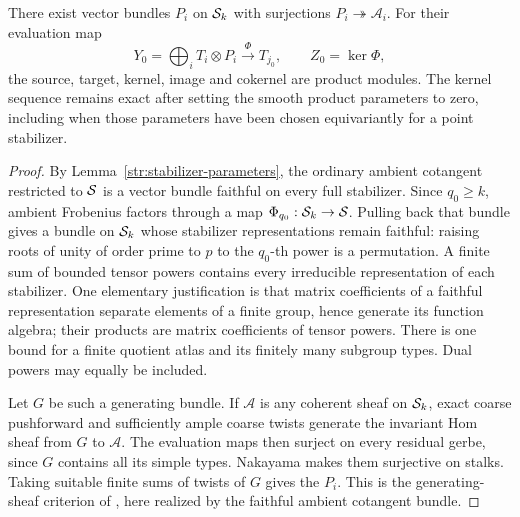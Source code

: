 \begin{lemma}\label{eu:three-modules}
There exist vector bundles $P_i$ on $\mathcal S_k$ with surjections
$P_i\twoheadrightarrow\mathcal A_i$.  For their evaluation map
\begin{equation}\label{eu:evaluation}
 Y_0=\bigoplus_iT_i\otimes P_i
       \xrightarrow{\ \Phi\ }T_{j_0},\qquad Z_0=\ker\Phi,
\end{equation}
the source, target, kernel, image and cokernel are product modules.
The kernel sequence remains exact after setting the smooth product
parameters to zero, including when those parameters have been chosen
equivariantly for a point stabilizer.
\end{lemma}

\begin{proof}
By Lemma~\ref{str:stabilizer-parameters}, the ordinary ambient
cotangent restricted to $\mathcal S$ is a vector bundle faithful on every
full stabilizer.  Since $q_0\ge k$, ambient Frobenius factors through
a map $\Phi_{q_0}:\mathcal S_k\to\mathcal S$.  Pulling back that bundle gives a
bundle on $\mathcal S_k$ whose stabilizer representations remain faithful:
raising roots of unity of order prime to $p$ to the $q_0$-th power
is a permutation.  A finite sum of
bounded tensor powers contains every irreducible representation of
each stabilizer.  One elementary justification is that matrix
coefficients of a faithful representation separate elements of a
finite group, hence generate its function algebra; their products are
matrix coefficients of tensor powers.  There is one bound for a
finite quotient atlas and its finitely many subgroup types.  Dual
powers may equally be included.

Let $G$ be such a generating bundle.  If $\mathcal A$ is any coherent
sheaf on $\mathcal S_k$, exact coarse pushforward and sufficiently ample coarse
twists generate the invariant Hom sheaf from $G$ to $\mathcal A$.
The evaluation maps then surject on every residual gerbe, since $G$
contains all its simple types.  Nakayama makes them surjective on
stalks.  Taking suitable finite sums of twists of $G$ gives the $P_i$.
This is the generating-sheaf criterion of
\cite[Definition~5.1 and Theorem~5.2]{OlssonStarr2003}, here realized
by the faithful ambient cotangent bundle.


\end{proof}
